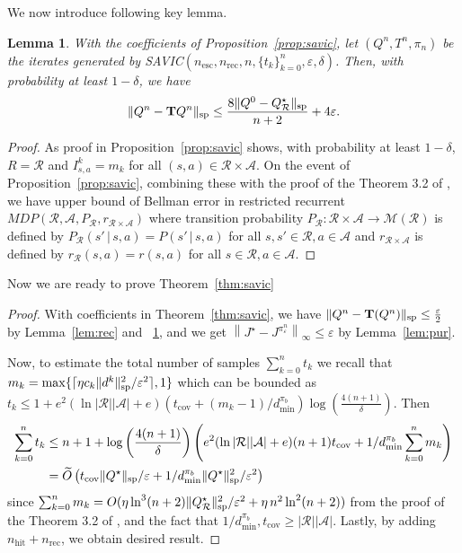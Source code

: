 \documentclass{article}
\newtheorem{lemma}[theorem]{Lemma}
\theoremstyle{definition}
\theoremstyle{remark}
\newcommand{\cA}{\mathcal{A}}
\newcommand{\cM}{\mathcal{M}}
\newcommand{\cR}{\mathcal{R}}
\newcommand{\T}{\mathbf{T}}
\newcommand*{\infn}[1]{\left\|{#1}\right\|_{\infty}}
\renewcommand{\sp}[1]{\|{#1}\|_\text{\rm sp}}
\begin{document}
We now introduce following key lemma. 
\begin{lemma}\label{lem:sam}
With the coefficients of Proposition~\ref{prop:savic}, let $(Q^n,T^n,\pi_{n})$ be the iterates generated  by  \mbox{SAVIC}$( n_{\mathrm{esc}},n_{\mathrm{rec}}, n, \{t_k\}^n_{k=0}, \varepsilon, \delta)$. Then, with probability at least $1-\delta$, we have
\vspace{-1ex}
\[  \sp{Q^n-\T Q^n}\leq \frac{8\sp{Q^0-Q_\cR^\star}}{n+2}+4\varepsilon.\]
\end{lemma}
\begin{proof}
As proof in Proposition~\ref{prop:savic} shows, with probability at least $1-\delta$, $R=\cR$ and $I^k_{s,a}=m_k$ for all $(s,a) \in \cR \times \cA $. On the event of Proposition~\ref{prop:savic}, combining these with the proof of the Theorem 3.2 of \citep{lee2025near}, we have upper bound of Bellman error in restricted recurrent $MDP(\cR,\cA, P_\cR, r_{\cR \times \cA})$ where transition probability $P_\cR: \cR\times \cA \rightarrow \cM(\cR)$ is defined by $P_\cR(s' \,|\, s,a) = P(s' \,|\, s,a)$ for all $s,s' \in \cR, a \in \cA$ and $ r_{\cR \times \cA}$ is defined by $r_\cR(s,a) = r(s,a)$ for all $s \in \cR, a \in \cA$.
\end{proof}
Now we are ready to prove Theorem~\ref{thm:savic}
\begin{proof}
With coefficients in Theorem~\ref{thm:savic}, we have $\sp{Q^n-\T(Q^n)}\le \frac{\varepsilon}{2}$ by Lemma~\ref{lem:rec} and ~\ref{lem:sam}, and we get  $\infn{J^\star-J^{\pi^n_{ \varepsilon}}} \le \varepsilon $ by Lemma~\ref{lem:pur}.

Now, to estimate the total number of samples $\sum_{k=0}^n t_k$ 
we recall that $m_k=\max\{\lceil\eta c_k\sp{d^{k}}^2/\varepsilon^{2}\rceil,1\}$ which can be bounded as $t_k\leq 1+e^2( \ln|\cR||\cA|+e)( t_{\mathrm{cov}}+(m_k-1)/d^{\pi_b}_{\mathrm{min}})\log \left(\frac{4(n+1)}{\delta }\right)$. Then 
\begin{align*}
    \sum^{n}_{k=0} t_k &\le  n+1+\log \left(\frac{4(n+1)}{\delta }\right) \left(e^2( \ln|\cR||\cA|+e)(n+1)t_{\mathrm{cov}}  +1/d^{\pi_b}_{\mathrm{min}}\sum^n_{k=0}m_k \right)\\
    &= \widetilde{O}\left(t_{\mathrm{cov}}\sp{Q^\star}/\varepsilon+ 1/d^{\pi_b}_{\mathrm{min}} \sp{Q^\star}^2/\varepsilon^{2}\right)
\end{align*}
since $ \sum^n_{k=0}m_k=O(\mbox{$\eta\ln^3(n+2)\sp{Q_\cR^\star}^2/\varepsilon^{2}+\eta \,n^2\ln^2(n+2)$})$ from the proof of the Theorem 3.2 of \citep{lee2025near}, and the fact that $1/d^{\pi_b}_{\mathrm{min}}, t_{\mathrm{cov}} \ge |\cR||\cA|$.  Lastly, by adding $n_{\mathrm{hit}}+n_{\mathrm{rec}}$, we obtain desired result.

\end{proof}
\end{document}
